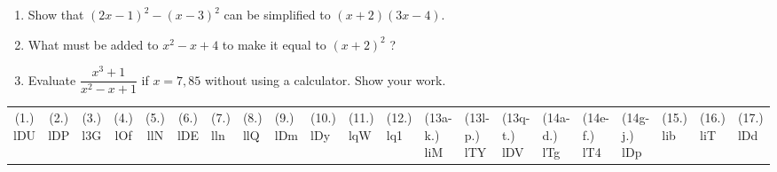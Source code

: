 \begin{eocexercises}{}
\begin{enumerate}[itemsep=5pt, label=\textbf{\arabic*}. ]
\item Show that ${(2x-1)}^{2}-{(x-3)}^{2}$ can be simplified to $(x+2)(3x-4)$.

\item What must be added to ${x}^{2}-x+4$ to make it equal to ${(x+2)}^{2}$ ?
\item Evaluate $\dfrac{x^{3}+1}{x^{2}-x+1}$ if $x=7,85$ without using a calculator. Show your work.
\end{enumerate}
\practiceinfo 
\par 
 \par \begin{tabular}[h]{cccccc}
 (1.) lDU  &  (2.) lDP  &  (3.) l3G  & (4.) lOf & (5.) llN & (6.) lDE &
 (7.) lln  &  (8.) llQ  &  (9.) lDm  & (10.) lDy & (11.) lqW & (12.) lq1 &
 (13a-k.)  liM  &  (13l-p.) lTY  &  (13q-t.) lDV  & (14a-d.) lTg & (14e-f.) lT4 & (14g-j.) lDp &
 (15.) lib  &  (16.) liT  &  (17.) lDd    \end{tabular}
\end{eocexercises}
